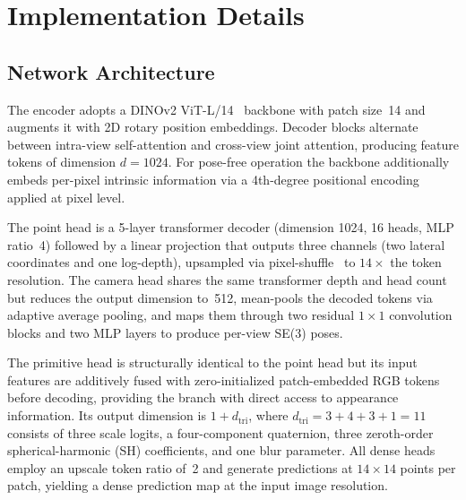 
\setcounter{table}{0}
\setcounter{figure}{0}
\setcounter{section}{0}
\renewcommand{\thetable}{\Alph{table}}
\renewcommand{\thefigure}{\Alph{figure}}
\renewcommand{\thesection}{\Alph{section}}
\setlength{\abovecaptionskip}{-0.1em}
\setlength{\belowcaptionskip}{0pt}

\section{Implementation Details}
\label{sec:app_implementation}

\subsection{Network Architecture}
\label{sec:app_architecture}

The encoder adopts a DINOv2 ViT-L/14~\citep{oquab2023dinov2} backbone with patch size~14 and augments it with 2D rotary position embeddings. Decoder blocks alternate between intra-view self-attention and cross-view joint attention, producing feature tokens of dimension $d\!=\!1024$. For pose-free operation the backbone additionally embeds per-pixel intrinsic information via a 4th-degree positional encoding applied at pixel level.

The point head is a 5-layer transformer decoder (dimension 1024, 16 heads, MLP ratio~4) followed by a linear projection that outputs three channels (two lateral coordinates and one log-depth), upsampled via pixel-shuffle~\citep{shi2016real} to $14\!\times$ the token resolution. The camera head shares the same transformer depth and head count but reduces the output dimension to~512, mean-pools the decoded tokens via adaptive average pooling, and maps them through two residual $1\!\times\!1$ convolution blocks and two MLP layers to produce per-view SE(3) poses.

The primitive head is structurally identical to the point head but its input features are additively fused with zero-initialized patch-embedded RGB tokens before decoding, providing the branch with direct access to appearance information. Its output dimension is $1 + d_{\mathrm{tri}}$, where $d_{\mathrm{tri}} = 3 + 4 + 3 + 1 = 11$ consists of three scale logits, a four-component quaternion, three zeroth-order spherical-harmonic (SH) coefficients, and one blur parameter. All dense heads employ an upscale token ratio of~2 and generate predictions at $14 \times 14$ points per patch, yielding a dense prediction map at the input image resolution.

